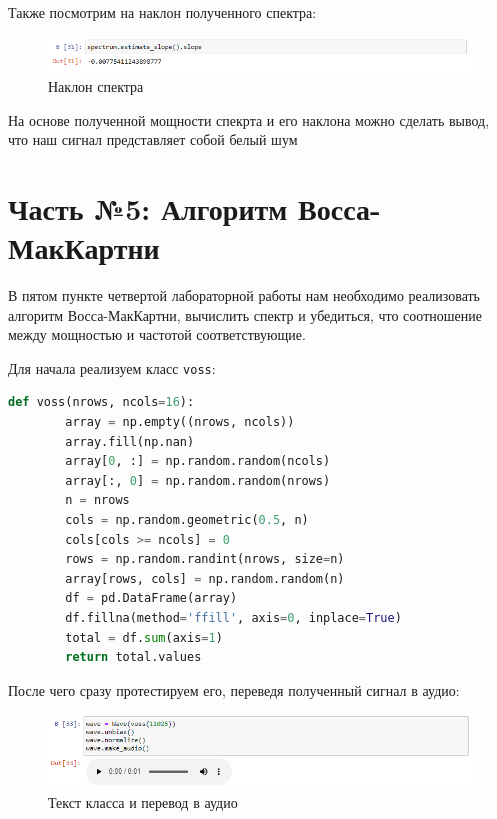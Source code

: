 \documentclass[a4paper]{article}
\begin{document}
            Также посмотрим на наклон полученного спектра:
            
            \begin{figure}[H]
                \centering
                \includegraphics[width=\textwidth]{ex_4_signal_estimate_slope.png}
                \caption{Наклон спектра}
                \label{fig:ex_4_signal_estimate_slope}
            \end{figure}
            
            На основе полученной мощности спекрта и его наклона можно сделать вывод, что наш сигнал представляет собой белый шум
    
    \newpage
        \section{Часть №5: Алгоритм Восса-МакКартни}
            В пятом пункте четвертой лабораторной работы нам необходимо реализовать алгоритм Восса-МакКартни, вычислить спектр и убедиться, что соотношение между мощностью и частотой соответствующие.
            
            Для начала реализуем класс \texttt{voss}:
            
\begin{lstlisting}[language=Python, caption= Класс \texttt{voss}]
    def voss(nrows, ncols=16):
        array = np.empty((nrows, ncols))
        array.fill(np.nan)
        array[0, :] = np.random.random(ncols)
        array[:, 0] = np.random.random(nrows)
        n = nrows
        cols = np.random.geometric(0.5, n)
        cols[cols >= ncols] = 0
        rows = np.random.randint(nrows, size=n)
        array[rows, cols] = np.random.random(n)
        df = pd.DataFrame(array)
        df.fillna(method='ffill', axis=0, inplace=True)
        total = df.sum(axis=1)
        return total.values
\end{lstlisting}       
            
            После чего сразу протестируем его, переведя полученный сигнал в аудио:
            
             \begin{figure}[H]
                \centering
                \includegraphics[width=\textwidth]{ex_5_wave_audio.png}
                \caption{Текст класса и перевод в аудио}
                \label{fig:ex_5_wave_audio}
            \end{figure}
            
\end{document}
